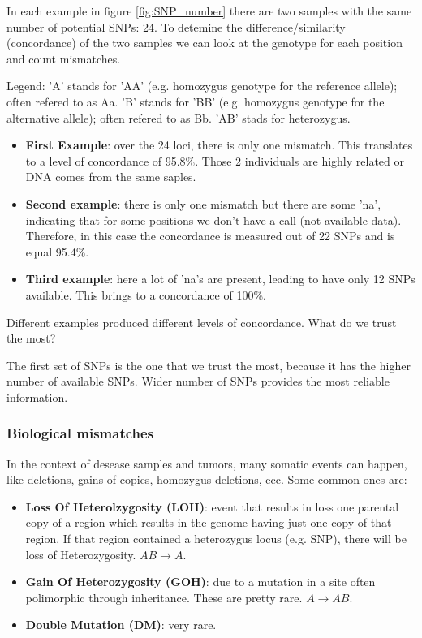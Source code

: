 In each example in figure \ref{fig:SNP_number} there are two samples with the
same number of potential SNPs: 24. To detemine the difference/similarity
(concordance) of the two samples we can look at the genotype for each position
and count mismatches.

Legend: 'A' stands for 'AA' (e.g. homozygus genotype for the reference allele);
often refered to as Aa. 'B' stands for 'BB' (e.g. homozygus genotype for the
alternative allele); often refered to as Bb. 'AB' stads for heterozygus.

\begin{itemize}
	\item \textbf{First Example}: over the 24 loci, there is only one mismatch.
	This translates to a level of concordance of 95.8\%. Those 2 individuals are
	highly related or DNA comes from the same saples. 
	   
	\item \textbf{Second example}: there is only one mismatch but there are some
	'na', indicating that for some positions we don't have a call (not available
	data). Therefore, in this case the concordance is measured out of 22 SNPs
	and is equal 95.4\%. 

	\item \textbf{Third example}: here a lot of 'na's are present, leading to
	have only 12 SNPs available. This brings to a concordance of 100\%. 
\end{itemize}

Different examples produced different levels of concordance. What do we trust
the most?

The first set of SNPs is the one that we trust the most, because it has the
higher number of available SNPs. Wider number of SNPs provides the most reliable
information. 

\subsubsection{Biological mismatches}

In the context of desease samples and tumors, many somatic events can happen,
like deletions, gains of copies, homozygus deletions, ecc. Some common ones are:
\begin{itemize}
	\item  \textbf{Loss Of Heterolzygosity (LOH)}:  event that results in loss
	one parental copy of a region which results in the genome having just one
	copy of that region. If that region contained a heterozygus locus (e.g.
	SNP), there will be loss of Heterozygosity. $AB \rightarrow A$.
	\item \textbf{Gain Of Heterozygosity (GOH)}: due to a mutation in a site
	often polimorphic through inheritance. These are pretty rare. $A \rightarrow
	AB$. 
	\item \textbf{Double Mutation (DM)}: very rare.  
\end{itemize}

